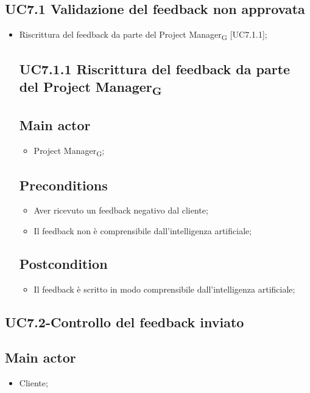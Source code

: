 \documentclass{article}
\begin{document}
    \subsection{UC7.1 Validazione del feedback non approvata}
    \begin{itemize}
        \item Riscrittura del feedback da parte del Project Manager\textsubscript{G}  [UC7.1.1];
        \subsection*{UC7.1.1 Riscrittura del feedback da parte del Project Manager\textsubscript{G} }
     \subsection*{Main actor}
         \begin{itemize}
             \item Project Manager\textsubscript{G};
         \end{itemize}
     \subsection*{Preconditions} 
        \begin{itemize}
            \item Aver ricevuto un feedback negativo dal cliente;
            \item Il feedback non è comprensibile dall'intelligenza artificiale;
        \end{itemize}
        \subsection*{Postcondition} 
        \begin{itemize}
            \item Il feedback è scritto in modo comprensibile dall'intelligenza artificiale;
        \end{itemize}
    \end{itemize}
    
\subsection{UC7.2-Controllo del feedback inviato}
    
     \subsection*{Main actor}
         \begin{itemize}
             \item Cliente;
         \end{itemize}
\end{document}
